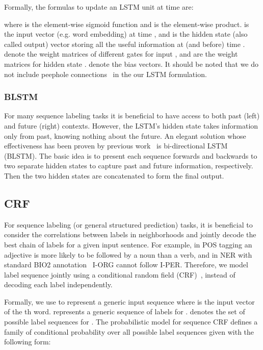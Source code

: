 \documentclass[11pt]{article}
\begin{document}
Formally, the formulas to update an LSTM unit at time  are:

where  is the element-wise sigmoid function and  is the element-wise product.  is the input vector (e.g. word embedding) at time , and  is the hidden state (also called output) vector storing all the useful information at (and before) time . 
 denote the weight matrices of different gates for input , and  are the weight matrices for hidden state .  denote the bias vectors. It should be noted that we do not include peephole connections~\cite{gers2003learning} in the our LSTM formulation.

\subsubsection{BLSTM}
For many sequence labeling tasks it is beneficial to have access to both past (left) and future (right) contexts. However, the LSTM's hidden state  takes information only from past, knowing nothing about the future. An elegant solution whose effectiveness has been proven by previous work~\cite{dyer-EtAl:2015:ACL-IJCNLP} is bi-directional LSTM (BLSTM). The basic idea is to present each sequence forwards and backwards to two separate hidden states to capture past and future information, respectively. Then the two hidden states are concatenated to form the final output.

\subsection{CRF}
For sequence labeling (or general structured prediction) tasks, it is beneficial to consider the correlations between labels in neighborhoods and jointly decode the best chain of labels for a given input sentence. For example, in POS tagging an adjective is more likely to be followed by a noun than a verb, and in NER with standard \textsf{BIO2} annotation~\cite{tksveenstra99eacl} \mbox{\textup{I-ORG}} cannot follow \textup{I-PER}. Therefore, we model label sequence jointly using a conditional random field (CRF)~\cite{lafferty2001}, instead of decoding each label independently.

Formally, we use  to represent a generic input sequence where  is the input vector of the th word. 
 represents a generic sequence of labels for .
 denotes the set of possible label sequences for .
The probabilistic model for sequence CRF defines a family of conditional probability  over all possible label sequences  given  with the following form:
\end{document}
